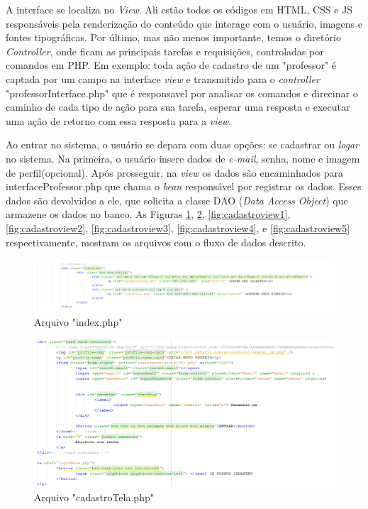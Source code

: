 A interface se localiza no \textit{View}. Ali estão todos os códigos em HTML, CSS e JS responsáveis pela renderização do conteúdo que interage com o usuário, imagens e fontes tipográficas. Por último, mas não menos importante, temos o diretório \textit{Controller}, onde ficam as principais tarefas e requisições, controladas por comandos em PHP. Em exemplo: toda ação de cadastro de um "professor" é captada por um campo na interface \textit{view} e transmitido para o \textit{controller} "professorInterface.php" que é responsavel por analisar os comandos e direcinar o caminho de cada tipo de ação para sua tarefa, esperar uma resposta e executar uma ação de retorno com essa resposta para a \textit{view}.

Ao entrar no sistema, o usuário se depara com duas opções: se cadastrar ou \textit{logar} no sistema. Na primeira, o usuário insere dados de \textit{e-mail}, senha, nome e imagem de perfil(opcional). Após prosseguir, na \textit{view} os dados são encaminhados para interfaceProfessor.php que chama o \textit{bean} responsável por registrar os dados. Esses dados são devolvidos a ele, que solicita a classe DAO (\textit{Data Access Object}) que armazene os dados no banco. As Figuras \ref{fig:loginoucadastro}, \ref{fig:cadastroview},
 \ref{fig:cadastroview1},
 \ref{fig:cadastroview2},
 \ref{fig:cadastroview3},
 \ref{fig:cadastroview4}, e
 \ref{fig:cadastroview5} respectivamente, mostram os arquivos com o fluxo de dados descrito.
 


\begin{figure}[!htb]
	\centering
	\includegraphics[width=0.9\linewidth]{loginOuCadastro}
	\caption{Arquivo "index.php"}
	\label{fig:loginoucadastro}
\end{figure}

\begin{figure}[!htb]
	\centering
	\includegraphics[width=0.9\linewidth]{cadastroView}
	\caption{Arquivo "cadastroTela.php" }
	\label{fig:cadastroview}
\end{figure}

